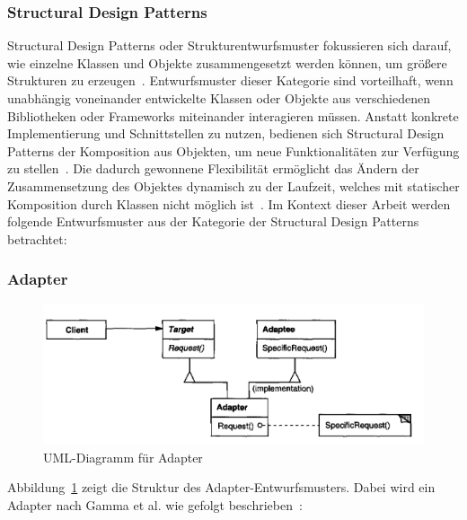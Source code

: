 \subsubsection{Structural Design Patterns}

Structural Design Patterns oder Strukturentwurfsmuster fokussieren sich darauf, wie einzelne Klassen und Objekte zusammengesetzt werden können, um größere Strukturen zu erzeugen~\cite[S. 137]{gamma1994design}.
Entwurfsmuster dieser Kategorie sind vorteilhaft, wenn unabhängig voneinander entwickelte Klassen oder Objekte aus verschiedenen Bibliotheken oder Frameworks miteinander interagieren müssen.
Anstatt konkrete Implementierung und Schnittstellen zu nutzen, bedienen sich Structural Design Patterns der Komposition aus Objekten, um neue Funktionalitäten zur Verfügung zu stellen~\cite[S. 137]{gamma1994design}.
Die dadurch gewonnene Flexibilität ermöglicht das Ändern der Zusammensetzung des Objektes dynamisch zu der Laufzeit, welches mit statischer Komposition durch Klassen nicht möglich ist~\cite[S. 137]{gamma1994design}.
Im Kontext dieser Arbeit werden folgende Entwurfsmuster aus der Kategorie der Structural Design Patterns betrachtet:

\subsubsection{Adapter}

\begin{figure}[h]
    \centering
    \includegraphics[scale=0.75]{figures/adapter.png}
    \caption{UML-Diagramm für Adapter}
    \label{fig:adapter}
\end{figure}

Abbildung~\ref{fig:adapter} zeigt die Struktur des Adapter-Entwurfsmusters. 
Dabei wird ein Adapter nach Gamma et al. wie gefolgt beschrieben~\cite[S. 141]{gamma1994design}:


